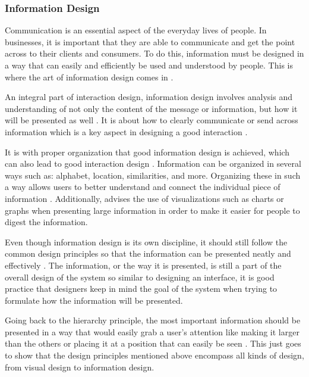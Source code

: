 	\subsubsection{Information Design}
    
		Communication is an essential aspect of the everyday lives of people. In businesses, it is important that they are able to communicate and get the point across to their clients and consumers. To do this, information must be designed in a way that can easily and efficiently be used and understood by people. This is where the art of information design comes in \citep{horn1999information}.
        
        An integral part of interaction design, information design involves analysis and understanding of not only the content of the message or information, but how it will be presented as well \citep{pettersson2002information}. It is about how to clearly communicate or send across information which is a key aspect in designing a good interaction \citep{shedroff1999information}.
        
        It is with proper organization that good information design is achieved, which can also lead to good interaction design \citep{shedroff1999information}. Information can be organized in several ways such as: alphabet, location, similarities, and more. Organizing these in such a way allows users to better understand and connect the individual piece of information \citep{shedroff1999information}. Additionally, \citet{blair2008user} advises the use of visualizations such as charts or graphs when presenting large information in order to make it easier for people to digest the information. 
        
        Even though information design is its own discipline, it should still follow the common design principles so that the information can be presented neatly and effectively \citep{shedroff1999information}. The information, or the way it is presented, is still a part of the overall design of the system so similar to designing an interface, it is good practice that designers keep in mind the goal of the system when trying to formulate how the information will be presented. 
        
        Going back to the hierarchy principle, the most important information should be presented in a way that would easily grab a user's attention like making it larger than the others or placing it at a position that can easily be seen \citep{mandelbaum2014design}. This just goes to show that the design principles mentioned above encompass all kinds of design, from visual design to information design.

